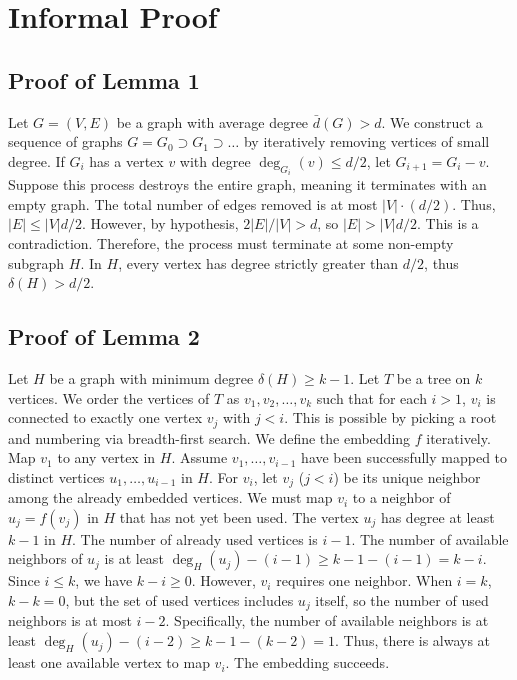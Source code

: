 \documentclass[11pt,a4paper]{article}
\begin{document}
\section{Informal Proof}

\subsection{Proof of Lemma 1}
Let $G = (V, E)$ be a graph with average degree $\bar{d}(G) > d$.
We construct a sequence of graphs $G = G_0 \supset G_1 \supset \dots$ by iteratively removing vertices of small degree.
If $G_i$ has a vertex $v$ with degree $\deg_{G_i}(v) \leq d/2$, let $G_{i+1} = G_i - v$.
Suppose this process destroys the entire graph, meaning it terminates with an empty graph.
The total number of edges removed is at most $|V| \cdot (d/2)$.
Thus, $|E| \leq |V|d/2$.
However, by hypothesis, $2|E|/|V| > d$, so $|E| > |V|d/2$. This is a contradiction.
Therefore, the process must terminate at some non-empty subgraph $H$.
In $H$, every vertex has degree strictly greater than $d/2$, thus $\delta(H) > d/2$.

\subsection{Proof of Lemma 2}
Let $H$ be a graph with minimum degree $\delta(H) \geq k-1$.
Let $T$ be a tree on $k$ vertices. We order the vertices of $T$ as $v_1, v_2, \dots, v_k$ such that for each $i > 1$, $v_i$ is connected to exactly one vertex $v_j$ with $j < i$. This is possible by picking a root and numbering via breadth-first search.
We define the embedding $f$ iteratively.
Map $v_1$ to any vertex in $H$.
Assume $v_1, \dots, v_{i-1}$ have been successfully mapped to distinct vertices $u_1, \dots, u_{i-1}$ in $H$.
For $v_i$, let $v_j$ ($j < i$) be its unique neighbor among the already embedded vertices.
We must map $v_i$ to a neighbor of $u_j = f(v_j)$ in $H$ that has not yet been used.
The vertex $u_j$ has degree at least $k-1$ in $H$.
The number of already used vertices is $i-1$.
The number of available neighbors of $u_j$ is at least $\deg_H(u_j) - (i-1) \geq k-1 - (i-1) = k - i$.
Since $i \leq k$, we have $k - i \geq 0$. However, $v_i$ requires one neighbor. When $i=k$, $k-k = 0$, but the set of used vertices includes $u_j$ itself, so the number of used neighbors is at most $i-2$.
Specifically, the number of available neighbors is at least $\deg_H(u_j) - (i-2) \geq k-1 - (k-2) = 1$.
Thus, there is always at least one available vertex to map $v_i$. The embedding succeeds.
\end{document}
